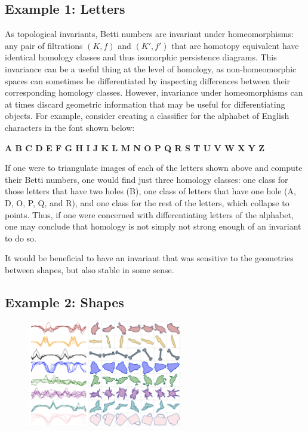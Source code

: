 \documentclass[12pt]{article}
\numberwithin{equation}{section}
\newcommand{\+}{%
	\raisebox{0.18ex}{\scaleobj{0.55}{+}}
}
\theoremstyle{definition}
\begin{document}
%
\subsection{Example 1: Letters}
As topological invariants, Betti numbers are invariant under homeomorphisms: any pair of filtrations $(K, f)$ and $(K', f')$ that are homotopy equivalent have identical homology classes and thus isomorphic persistence diagrams. 
This invariance can be a useful thing at the level of homology, as non-homeomorphic spaces can sometimes be differentiated by inspecting differences between their corresponding homology classes. 
However, invariance under homeomorphisms can at times discard geometric information that may be useful for differentiating objects.
For example, consider creating a classifier for the alphabet of English characters in the font shown below:
\vspace{0.5em}
\\
\vspace{0.5em}
\begin{ttfamily}
	\selectfont \bfseries
	\hfill A B C D E F G H I J K L M N O P Q R S T U V W X Y Z \hfill 
\end{ttfamily}

\noindent If one were to triangulate images of each of the letters shown above and compute their Betti numbers, one would find just three homology classes: one class for those letters that have two holes (B), one class of letters that have one hole (A, D, O, P, Q, and R), and one class for the rest of the letters, which collapse to points. Thus, if one were concerned with differentiating letters of the alphabet, one may conclude that homology is not simply not strong enough of an invariant to do so. 

It would be beneficial to have an invariant that was sensitive to the geometries between shapes, but also stable in some sense.

\subsection{Example 2: Shapes}
\begin{figure}
	\centering
	\includegraphics[width=0.6\textwidth]{shape_signatures}
\end{figure}
\end{document}

